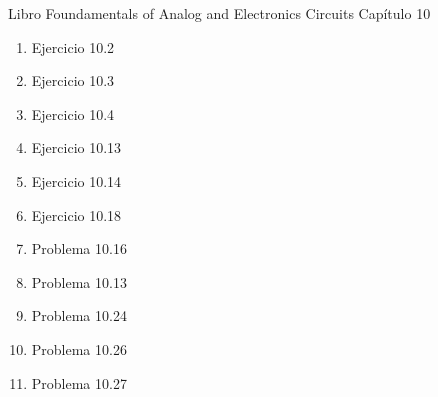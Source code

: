 \begin{problemset}
\item Libro Foundamentals of Analog and Electronics Circuits Capítulo 10
\begin{enumerate}
    \item Ejercicio 10.2
    \item Ejercicio 10.3
    \item Ejercicio 10.4
    \item Ejercicio 10.13
    \item Ejercicio 10.14
    \item Ejercicio 10.18
     \item Problema 10.16
     \item Problema 10.13
     \item Problema 10.24
     \item Problema 10.26
     \item Problema 10.27
     
\end{enumerate}


\end{problemset}

\newpage
